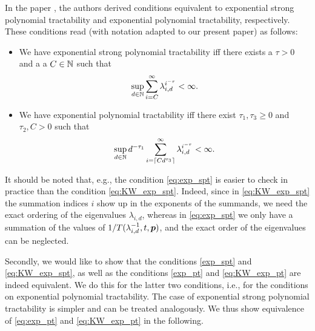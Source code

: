 \documentclass[sort&compress]{elsarticle}
\newcommand{\peter}[1]{\begingroup\color{purple}#1\endgroup}
\begin{document}
\peter{
In the paper \cite{KriWoz19a}, the authors derived conditions equivalent to exponential strong polynomial tractability and exponential polynomial tractability, respectively. These conditions read (with notation adapted to our present paper) as follows:
\begin{itemize}
    \item We have exponential strong polynomial tractability iff there exists a $\tau>0$ and a 
    a $C\in\mathbb{N}$ such that
    \begin{equation}\label{eq:KW_exp_spt}
        \sup_{d\in\mathbb{N}} \sum_{i=C}^{\infty} \lambda_{i,d}^{i^{-\tau}} < \infty. 
    \end{equation}
    \item We have exponential polynomial tractability iff there exist $\tau_1,\tau_3\ge 0$ and $\tau_2, C>0$ such that
    \begin{equation}\label{eq:KW_exp_pt}
        \sup_{d\in\mathbb{N}} d^{-\tau_1} \sum_{i=\lceil C d^{\tau_3} \rceil}^{\infty} \lambda_{i,d}^{i^{-\tau}} < \infty. 
    \end{equation}
\end{itemize}
It should be noted that, e.g., the condition \eqref{eq:exp_spt} is easier to check in practice than the condition \eqref{eq:KW_exp_spt}. Indeed, since in \eqref{eq:KW_exp_spt} the summation indices $i$ show up in the exponents of the summands, we need the exact ordering of the eigenvalues $\lambda_{i,d}$, whereas in \eqref{eq:exp_spt} we only have a summation of the values of $1/T(\lambda_{i,d}^{-1},t,\boldsymbol{p})$, and the exact order of the eigenvalues can be neglected.

Secondly, we would like to show that the conditions \eqref{exp_spt} and \eqref{eq:KW_exp_spt}, as well as the conditions \eqref{exp_pt} and \eqref{eq:KW_exp_pt} are indeed equivalent. We do this for the latter two conditions, i.e., for the conditions on exponential polynomial tractability. The case of exponential strong polynomial tractability is simpler and can be treated analogously. We thus show equivalence of \eqref{eq:exp_pt} and \eqref{eq:KW_exp_pt} in the following. 

}
\end{document}
